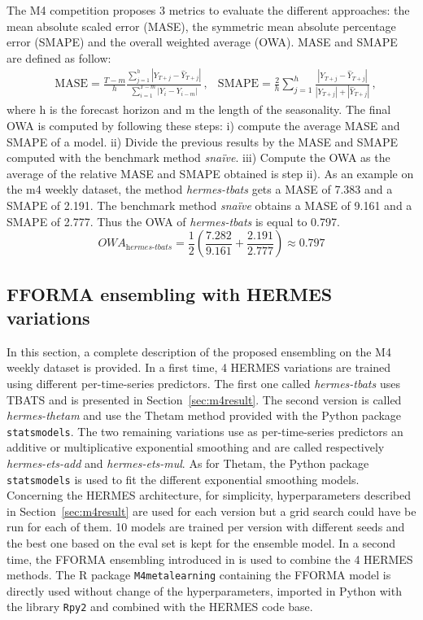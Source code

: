 \documentclass[review]{elsarticle}
\begin{document}
The M4 competition proposes 3 metrics to evaluate the different approaches: the mean absolute scaled error (MASE), the symmetric mean absolute percentage error (SMAPE) and the overall weighted average (OWA). MASE and SMAPE are defined as follow:
\begin{align*}
&\mathrm{MASE} = \frac{T-m}{h}\frac{\sum_{j=1}^h |Y_{T+j} - \hat{Y}_{T+j}| }{\sum_{i=1}^{T-m} |Y_i - Y_{i-m}|}\,,
&\mathrm{SMAPE} = \frac{2}{h}\sum_{j=1}^h\frac{|Y_{T+j} - \hat{Y}_{T+j}|}{|Y_{T+j}| + |\hat{Y}_{T+j}|}\,,
\end{align*}
where h is the forecast horizon and m the length of the seasonality. The final OWA is computed by following these steps: i) compute the average MASE and SMAPE of a model. ii) Divide the previous results by the MASE and SMAPE computed with the benchmark method \textit{snaïve}. iii) Compute the OWA as the average of the relative MASE and SMAPE obtained is step ii). As an example on the m4 weekly dataset, the method \textit{hermes-tbats} gets a MASE of 7.383 and a SMAPE of 2.191. The benchmark method \textit{snaïve} obtains a MASE of 9.161 and a SMAPE of 2.777. Thus the OWA of  \textit{hermes-tbats} is equal to 0.797.
\begin{equation*}
    OWA_{\textit{hermes-tbats}} = \frac{1}{2}(\frac{7.282}{9.161} + \frac{2.191}{2.777}) \approx 0.797
\end{equation*} 

\subsection{FFORMA ensembling with HERMES variations}
\label{sec:fforma-hermes}

In this section, a complete description of the proposed ensembling on the M4 weekly dataset is provided. In a first time, 4 HERMES variations are trained using different per-time-series predictors. The first one called \textit{hermes-tbats} uses TBATS and is presented in Section~\ref{sec:m4result}. The second version is called \textit{hermes-thetam} and use the Thetam method provided with the Python package \texttt{statsmodels}. The two remaining variations use as per-time-series predictors an additive or multiplicative exponential smoothing and are called respectively \textit{hermes-ets-add} and \textit{hermes-ets-mul}. As for Thetam, the Python package \texttt{statsmodels} is used to fit the different exponential smoothing models. Concerning the HERMES architecture, for simplicity, hyperparameters described in Section~\ref{sec:m4result} are used for each version but a grid search could have be run for each of them. 10 models are trained per version with different seeds and the best one based on the eval set is kept for the ensemble model. In a second time, the FFORMA ensembling introduced in \cite{montero2020} is used to combine the 4 HERMES methods. The R package \texttt{M4metalearning} containing the FFORMA model is directly used without change of the hyperparameters, imported in Python with the library \texttt{Rpy2} and combined with the HERMES code base.
\end{document}
